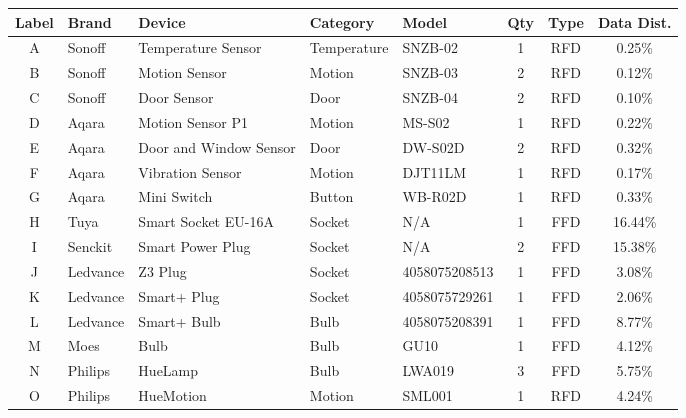 \begin{table}[t]
\centering
\footnotesize
\setlength{\tabcolsep}{3pt}
\renewcommand{\arraystretch}{1.1}
\begin{tabularx}{\columnwidth}{c l X l l c c c}
\toprule
\textbf{Label} & \textbf{Brand} & \textbf{Device} & \textbf{Category} & \textbf{Model} & \textbf{Qty} & \textbf{Type} & \textbf{Data Dist.} \\
\midrule
A & Sonoff   & Temperature Sensor     & Temperature & SNZB-02       & 1 & RFD & 0.25\% \\
B & Sonoff   & Motion Sensor          & Motion      & SNZB-03       & 2 & RFD & 0.12\% \\
C & Sonoff   & Door Sensor            & Door        & SNZB-04       & 2 & RFD & 0.10\% \\
D & Aqara    & Motion Sensor P1       & Motion      & MS-S02        & 1 & RFD & 0.22\% \\
E & Aqara    & Door and Window Sensor & Door        & DW-S02D       & 2 & RFD & 0.32\% \\
F & Aqara    & Vibration Sensor       & Motion      & DJT11LM       & 1 & RFD & 0.17\% \\
G & Aqara    & Mini Switch            & Button      & WB-R02D       & 1 & RFD & 0.33\% \\
H & Tuya     & Smart Socket EU-16A    & Socket      & N/A           & 1 & FFD & 16.44\% \\
I & Senckit  & Smart Power Plug       & Socket      & N/A           & 2 & FFD & 15.38\% \\
J & Ledvance & Z3 Plug                & Socket      & 4058075208513 & 1 & FFD & 3.08\% \\
K & Ledvance & Smart+ Plug            & Socket      & 4058075729261 & 1 & FFD & 2.06\% \\
L & Ledvance & Smart+ Bulb            & Bulb        & 4058075208391 & 1 & FFD & 8.77\% \\
M & Moes     & Bulb                   & Bulb        & GU10          & 1 & FFD & 4.12\% \\
N & Philips  & HueLamp                & Bulb        & LWA019        & 3 & FFD & 5.75\% \\
O & Philips  & HueMotion              & Motion      & SML001        & 1 & RFD & 4.24\% \\
\bottomrule
\end{tabularx}

\end{table}
